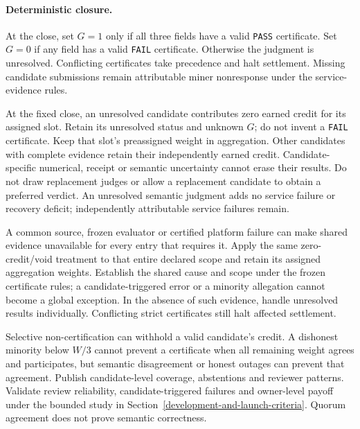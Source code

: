 \paragraph{Deterministic closure.}
At the close, set \(G=1\) only if all three fields have a valid
\texttt{PASS} certificate. Set \(G=0\) if any field has a valid
\texttt{FAIL} certificate. Otherwise the judgment is unresolved.
Conflicting certificates take precedence and
halt settlement. Missing candidate submissions remain attributable
miner nonresponse under the service-evidence rules.

At the fixed close, an unresolved candidate contributes zero earned
credit for its assigned slot. Retain its unresolved status and unknown
\(G\); do not invent a \texttt{FAIL} certificate. Keep that slot's
preassigned weight in aggregation. Other candidates with complete evidence
retain their independently earned credit. Candidate-specific numerical,
receipt or semantic uncertainty cannot erase their results. Do not draw
replacement judges or allow a replacement candidate to obtain a preferred
verdict. An unresolved semantic judgment adds no service failure or
recovery deficit; independently attributable service failures remain.

A common source, frozen evaluator or certified platform failure can make
shared evidence unavailable for every entry that requires it. Apply the
same zero-credit/void treatment to that entire declared scope and retain
its assigned aggregation weights. Establish the shared cause and scope
under the frozen certificate rules; a candidate-triggered error or a
minority allegation cannot become a global exception. In the absence of
such evidence, handle unresolved results individually. Conflicting strict
certificates still halt affected settlement.

Selective non-certification can
withhold a valid candidate's credit. A dishonest minority below \(W/3\)
cannot prevent a certificate when all remaining weight agrees and
participates, but semantic disagreement or honest outages can prevent that
agreement. Publish candidate-level coverage, abstentions and reviewer
patterns. Validate review reliability, candidate-triggered failures and
owner-level payoff under the bounded study in
Section~\ref{development-and-launch-criteria}. Quorum agreement does not
prove semantic correctness.

